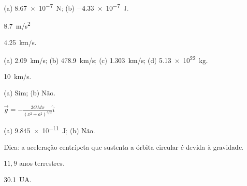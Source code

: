 \documentclass[a4paper]{article}
\begin{document}
\begin{respostas}
  \begin{exercicio}
   (a) \SI{8.67e-7}{N}; (b) \SI{-4.33e-7}{J}.
  \end{exercicio}
  
  \begin{exercicio*}
    \SI{8.7}{m/s^2}
  \end{exercicio*}
  
  \begin{exercicio}
   \SI{4.25}{km/s}.
  \end{exercicio}
  
  \begin{exercicio}
   (a) \SI{2.09}{km/s}; (b) \SI{478.9}{km/s}; (c) \SI{1.303}{km/s}; (d) \SI{5.13e22}{kg}.
  \end{exercicio}

  \begin{exercicio}
   \SI{10}{km/s}.
  \end{exercicio}
  
  \begin{exercicio}
   (a) Sim; (b) Não.
  \end{exercicio}
  
  \begin{exercicio}
   $\vec g = -\frac{2GMx}{\left(x^2 + a^2\right)^{3/2}}\hat i$
  \end{exercicio}
  
  \begin{exercicio}
   (a) \SI{9.845e-11}{J}; (b) Não.
  \end{exercicio}
  
  \begin{exercicio}
   Dica: a aceleração centrípeta que sustenta a órbita circular é devida à gravidade.
  \end{exercicio}
  
  \begin{exercicio}
   $11,9$ anos terrestres.
  \end{exercicio}
  
  \begin{exercicio}
   \SI{30.1}{UA}.
  \end{exercicio}
  
  \begin{exercicio}
   

\end{exercicio}
\end{respostas}
\end{document}
